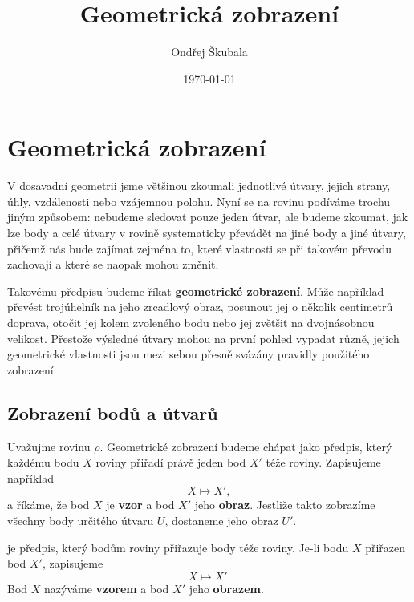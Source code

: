 \documentclass[12pt,a4paper]{article}
\title{Geometrická zobrazení}
\author{Ondřej Škubala}
\date{\today}
\begin{document}
\maketitle
\newpage


\section{Geometrická zobrazení}

V dosavadní geometrii jsme většinou zkoumali jednotlivé útvary, jejich strany, úhly, vzdálenosti nebo vzájemnou polohu. Nyní se na rovinu podíváme trochu jiným způsobem: nebudeme sledovat pouze jeden útvar, ale budeme zkoumat, jak lze body a celé útvary v rovině systematicky převádět na jiné body a jiné útvary, přičemž nás bude zajímat zejména to, které vlastnosti se při takovém převodu zachovají a které se naopak mohou změnit.

Takovému předpisu budeme říkat \textbf{geometrické zobrazení}. Může například převést trojúhelník na jeho zrcadlový obraz, posunout jej o několik centimetrů doprava, otočit jej kolem zvoleného bodu nebo jej zvětšit na dvojnásobnou velikost. Přestože výsledné útvary mohou na první pohled vypadat různě, jejich geometrické vlastnosti jsou mezi sebou přesně svázány pravidly použitého zobrazení.

\subsection{Zobrazení bodů a útvarů}

Uvažujme rovinu $\rho$. Geometrické zobrazení budeme chápat jako předpis, který každému bodu $X$ roviny přiřadí právě jeden bod $X'$ téže roviny. Zapisujeme například
\[
    X \mapsto X',
\]
a říkáme, že bod $X$ je \textbf{vzor} a bod $X'$ jeho \textbf{obraz}. Jestliže takto zobrazíme všechny body určitého útvaru $U$, dostaneme jeho obraz $U'$.

\begin{definitionbox}
     je předpis, který bodům roviny přiřazuje body téže roviny. Je-li bodu $X$ přiřazen bod $X'$, zapisujeme
    \[
        X \mapsto X'.
    \]
    Bod $X$ nazýváme \textbf{vzorem} a bod $X'$ jeho \textbf{obrazem}.
\end{definitionbox}
\end{document}

